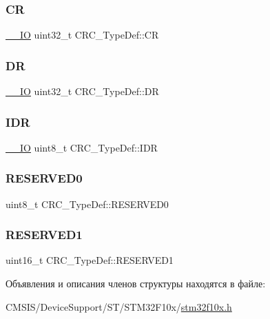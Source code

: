 \subsubsection{\texorpdfstring{CR}{CR}}
{\footnotesize\ttfamily \mbox{\hyperlink{group___c_m_s_i_s___c_m3__core__definitions_gaec43007d9998a0a0e01faede4133d6be}{\+\_\+\+\_\+\+IO}} uint32\+\_\+t C\+R\+C\+\_\+\+Type\+Def\+::\+CR}

\mbox{\label{struct_c_r_c___type_def_a50cb22870dbb9001241cec694994e5ef}} 
\subsubsection{\texorpdfstring{DR}{DR}}
{\footnotesize\ttfamily \mbox{\hyperlink{group___c_m_s_i_s___c_m3__core__definitions_gaec43007d9998a0a0e01faede4133d6be}{\+\_\+\+\_\+\+IO}} uint32\+\_\+t C\+R\+C\+\_\+\+Type\+Def\+::\+DR}

\mbox{\label{struct_c_r_c___type_def_ad84e8694cd4b5375ee533c2d875c3b5a}} 
\subsubsection{\texorpdfstring{IDR}{IDR}}
{\footnotesize\ttfamily \mbox{\hyperlink{group___c_m_s_i_s___c_m3__core__definitions_gaec43007d9998a0a0e01faede4133d6be}{\+\_\+\+\_\+\+IO}} uint8\+\_\+t C\+R\+C\+\_\+\+Type\+Def\+::\+I\+DR}

\mbox{\label{struct_c_r_c___type_def_a70dfd1730dba65041550ef55a44db87c}} 
\subsubsection{\texorpdfstring{RESERVED0}{RESERVED0}}
{\footnotesize\ttfamily uint8\+\_\+t C\+R\+C\+\_\+\+Type\+Def\+::\+R\+E\+S\+E\+R\+V\+E\+D0}

\mbox{\label{struct_c_r_c___type_def_a8b205c6e25b1808ac016db2356b3021d}} 
\subsubsection{\texorpdfstring{RESERVED1}{RESERVED1}}
{\footnotesize\ttfamily uint16\+\_\+t C\+R\+C\+\_\+\+Type\+Def\+::\+R\+E\+S\+E\+R\+V\+E\+D1}



Объявления и описания членов структуры находятся в файле\+:\begin{DoxyCompactItemize}
\item 
C\+M\+S\+I\+S/\+Device\+Support/\+S\+T/\+S\+T\+M32\+F10x/\mbox{\hyperlink{stm32f10x_8h}{stm32f10x.\+h}}\end{DoxyCompactItemize}
